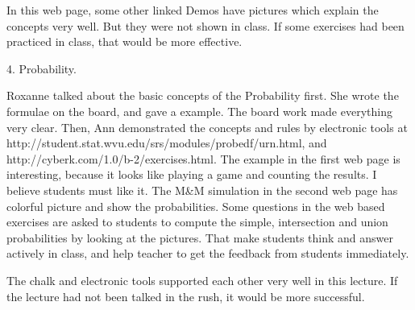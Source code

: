 In this web page, some other linked Demos have pictures which explain the 
concepts very well. But they were not shown in class. If some exercises had 
been practiced in class, that would be more effective.


4. Probability.

Roxanne talked about the basic concepts of the Probability first. She wrote 
the formulae on the board, and gave a example. The board work made everything 
very clear. Then, Ann demonstrated the concepts and rules by electronic tools 
at http://student.stat.wvu.edu/srs/modules/probedf/urn.html, and 
http://cyberk.com/1.0/b-2/exercises.html. The example in the first web page is 
interesting, because it looks like playing a game and counting the results. I 
believe students must like it. The M&M simulation in the second web page has 
colorful picture and show the probabilities. Some questions in the web based 
exercises are asked to students to compute the simple, intersection and union 
probabilities by looking at the pictures. That make students think and answer 
actively in class, and help teacher to get the feedback from students 
immediately.

The chalk and electronic tools supported each other very well in this lecture. 
If the lecture had not been talked in the rush, it would be more successful.

